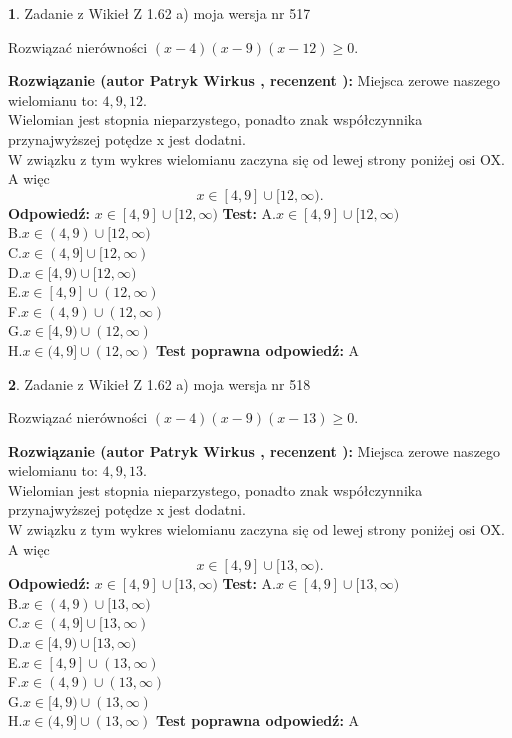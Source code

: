 \documentclass[12pt, a4paper]{article}
\theoremstyle{definition} %
\newtheorem{zad}{}
\newcommand{\zadStart}[1]{\begin{zad}#1\newline}
\newcommand{\zadStop}{\end{zad}}
\newcommand{\rozwStart}[2]{\noindent \textbf{Rozwiązanie (autor #1 , recenzent #2): }\newline}
\newcommand{\rozwStop}{\newline}
\newcommand{\odpStart}{\noindent \textbf{Odpowiedź:}\newline}
\newcommand{\odpStop}{\newline}
\newcommand{\testStart}{\noindent \textbf{Test:}\newline}
\newcommand{\testStop}{\newline}
\newcommand{\kluczStart}{\noindent \textbf{Test poprawna odpowiedź:}\newline}
\newcommand{\kluczStop}{\newline}
\begin{document}
\zadStart{Zadanie z Wikieł Z 1.62 a) moja wersja nr 517}

Rozwiązać nierówności $(x-4)(x-9)(x-12)\ge0$.
\zadStop
\rozwStart{Patryk Wirkus}{}
Miejsca zerowe naszego wielomianu to: $4, 9, 12$.\\
Wielomian jest stopnia nieparzystego, ponadto znak współczynnika przy\linebreak najwyższej potędze x jest dodatni.\\ W związku z tym wykres wielomianu zaczyna się od lewej strony poniżej osi OX. A więc $$x \in [4,9] \cup [12,\infty).$$
\rozwStop
\odpStart
$x \in [4,9] \cup [12,\infty)$
\odpStop
\testStart
A.$x \in [4,9] \cup [12,\infty)$\\
B.$x \in (4,9) \cup [12,\infty)$\\
C.$x \in (4,9] \cup [12,\infty)$\\
D.$x \in [4,9) \cup [12,\infty)$\\
E.$x \in [4,9] \cup (12,\infty)$\\
F.$x \in (4,9) \cup (12,\infty)$\\
G.$x \in [4,9) \cup (12,\infty)$\\
H.$x \in (4,9] \cup (12,\infty)$
\testStop
\kluczStart
A
\kluczStop



\zadStart{Zadanie z Wikieł Z 1.62 a) moja wersja nr 518}

Rozwiązać nierówności $(x-4)(x-9)(x-13)\ge0$.
\zadStop
\rozwStart{Patryk Wirkus}{}
Miejsca zerowe naszego wielomianu to: $4, 9, 13$.\\
Wielomian jest stopnia nieparzystego, ponadto znak współczynnika przy\linebreak najwyższej potędze x jest dodatni.\\ W związku z tym wykres wielomianu zaczyna się od lewej strony poniżej osi OX. A więc $$x \in [4,9] \cup [13,\infty).$$
\rozwStop
\odpStart
$x \in [4,9] \cup [13,\infty)$
\odpStop
\testStart
A.$x \in [4,9] \cup [13,\infty)$\\
B.$x \in (4,9) \cup [13,\infty)$\\
C.$x \in (4,9] \cup [13,\infty)$\\
D.$x \in [4,9) \cup [13,\infty)$\\
E.$x \in [4,9] \cup (13,\infty)$\\
F.$x \in (4,9) \cup (13,\infty)$\\
G.$x \in [4,9) \cup (13,\infty)$\\
H.$x \in (4,9] \cup (13,\infty)$
\testStop
\kluczStart
A
\kluczStop
\end{document}
